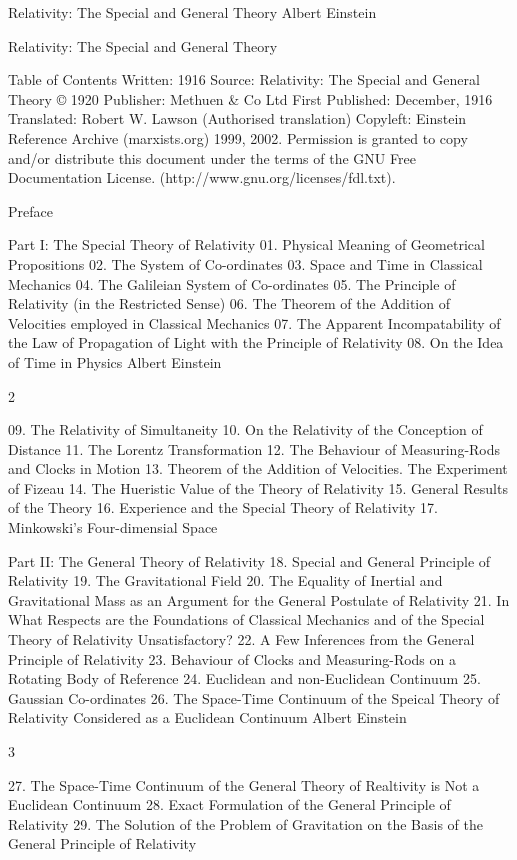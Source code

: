 \documentclass{article}
\begin{document}
Relativity: The Special and General Theory
Albert Einstein

Relativity: The Special and General Theory

Table of Contents
Written: 1916
Source: Relativity: The Special and General Theory © 1920
Publisher: Methuen \& Co Ltd
First Published: December, 1916
Translated: Robert W. Lawson (Authorised translation)
Copyleft: Einstein Reference Archive (marxists.org) 1999, 2002.
Permission is granted to copy and/or distribute this document under
the terms of the GNU Free Documentation License.
(http://www.gnu.org/licenses/fdl.txt).

Preface

Part I: The Special Theory of Relativity
01. Physical Meaning of Geometrical Propositions
02. The System of Co-ordinates
03. Space and Time in Classical Mechanics
04. The Galileian System of Co-ordinates
05. The Principle of Relativity (in the Restricted Sense)
06. The Theorem of the Addition of Velocities employed in Classical Mechanics
07. The Apparent Incompatability of the Law of Propagation of Light with the
Principle of Relativity
08. On the Idea of Time in Physics
Albert Einstein

2

09. The Relativity of Simultaneity
10. On the Relativity of the Conception of Distance
11. The Lorentz Transformation
12. The Behaviour of Measuring-Rods and Clocks in Motion
13. Theorem of the Addition of Velocities. The Experiment of Fizeau
14. The Hueristic Value of the Theory of Relativity
15. General Results of the Theory
16. Experience and the Special Theory of Relativity
17. Minkowski's Four-dimensial Space

Part II: The General Theory of Relativity
18. Special and General Principle of Relativity
19. The Gravitational Field
20. The Equality of Inertial and Gravitational Mass as an Argument for the General
Postulate of Relativity
21. In What Respects are the Foundations of Classical Mechanics and of the
Special Theory of Relativity Unsatisfactory?
22. A Few Inferences from the General Principle of Relativity
23. Behaviour of Clocks and Measuring-Rods on a Rotating Body of Reference
24. Euclidean and non-Euclidean Continuum
25. Gaussian Co-ordinates
26. The Space-Time Continuum of the Speical Theory of Relativity Considered as
a Euclidean Continuum
Albert Einstein

3

27. The Space-Time Continuum of the General Theory of Realtivity is Not a
Euclidean Continuum
28. Exact Formulation of the General Principle of Relativity
29. The Solution of the Problem of Gravitation on the Basis of the General
Principle of Relativity
\end{document}
